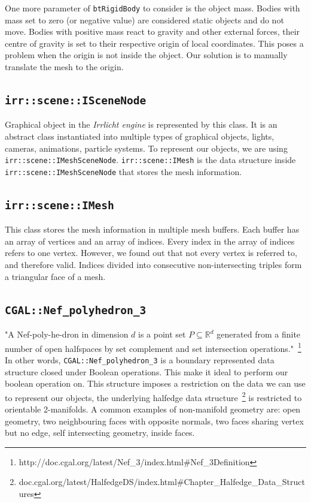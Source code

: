 One more parameter of {\tt btRigidBody} to consider is the object mass. Bodies with mass set to zero (or negative value) are considered static objects and do not move. Bodies with positive mass react to gravity and other external forces, their centre of gravity is set to their respective origin of local coordinates. This poses a problem when the origin is not inside the object. Our solution is to manually translate the mesh to the origin. 

\subsection*{\tt irr::scene::ISceneNode} 
Graphical object in the \emph{Irrlicht engine} is represented by this class. It is an abstract class instantiated into multiple types of graphical objects, \eg lights, cameras, animations, particle systems. To represent our objects, we are using {\tt irr::scene::IMeshSceneNode}. {\tt irr::scene::IMesh} is the data structure inside {\tt irr::scene::IMeshSceneNode} that stores the mesh information. 

\subsection*{\tt irr::scene::IMesh} 
This class stores the mesh information in multiple mesh buffers. Each buffer has an array of vertices and an array of indices. Every index in the array of indices refers to one vertex. However, we found out that not every vertex is referred to, and therefore valid. Indices divided into consecutive non-intersecting triples form a triangular face of a mesh. 

\subsection*{\tt CGAL::Nef\_polyhedron\_3}
\label{sec:nef}
"A Nef-poly-he-dron in dimension $d$ is a point set $P \subseteq \mathbb{R}^d$ generated from a finite number of open halfspaces by set complement and set intersection operations."~\footnote{http://doc.cgal.org/latest/Nef\_3/index.html\#Nef\_3Definition} In other words, {\tt CGAL::Nef\_polyhedron\_3} is a boundary represented data structure closed under Boolean operations. This make it ideal to perform our boolean operation on.
This structure imposes a restriction on the data we can use to represent our objects, the underlying halfedge data structure~\footnote{doc.cgal.org/latest/HalfedgeDS/index.html\#Chapter\_Halfedge\_Data\_Structures} is restricted to orientable 2-manifolds. A common examples of non-manifold geometry are: open geometry, two neighbouring faces with opposite normals, two faces sharing vertex but no edge, self intersecting geometry, inside faces.

